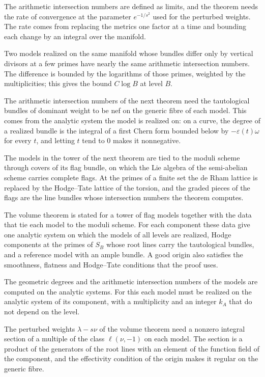 The arithmetic intersection numbers are defined as limits, and the theorem needs the rate of
convergence at the parameter $e^{-1/s^2}$ used for the perturbed weights. The rate comes from
replacing the metrics one factor at a time and bounding each change by an integral over the
manifold.

Two models realized on the same manifold whose bundles differ only by vertical divisors at a few
primes have nearly the same arithmetic intersection numbers. The difference is bounded by the
logarithms of those primes, weighted by the multiplicities; this gives the bound
$C\log B$ at level $B$.

The arithmetic intersection numbers of the next theorem need the tautological bundles of dominant
weight to be nef on the generic fibre of each model. This comes from the analytic system the model
is realized on: on a curve, the degree of a realized bundle is the integral of a first Chern form
bounded below by $-\varepsilon(t)\omega$ for every $t$, and letting $t$ tend to $0$ makes it
nonnegative.

The models in the tower of the next theorem are tied to the moduli scheme through covers of its
flag bundle, on which the Lie algebra of the semi-abelian scheme carries complete flags. At the
primes of a finite set the de Rham lattice is replaced by the Hodge--Tate lattice of the torsion, and
the graded pieces of the flags are the line bundles whose intersection numbers the theorem
computes.

The volume theorem is stated for a tower of flag models together with the data that tie each model
to the moduli scheme. For each component these data give one analytic system on which the models of
all levels are realized, Hodge components at the primes of $S_B$ whose root lines carry the
tautological bundles, and a reference model with an ample bundle. A good origin also satisfies the
smoothness, flatness and Hodge--Tate conditions that the proof uses.

The geometric degrees and the arithmetic intersection numbers of the models are computed on the
analytic systems. For this each model must be realized on the analytic system of its component,
with a multiplicity and an integer $k_A$ that do not depend on the level.

The perturbed weights $\lambda-s\nu$ of the volume theorem need a nonzero integral section of a
multiple of the class $\ell(\nu,-1)$ on each model. The section is a product of the generators of the
root lines with an element of the function field of the component, and the effectivity condition of
the origin makes it regular on the generic fibre.

